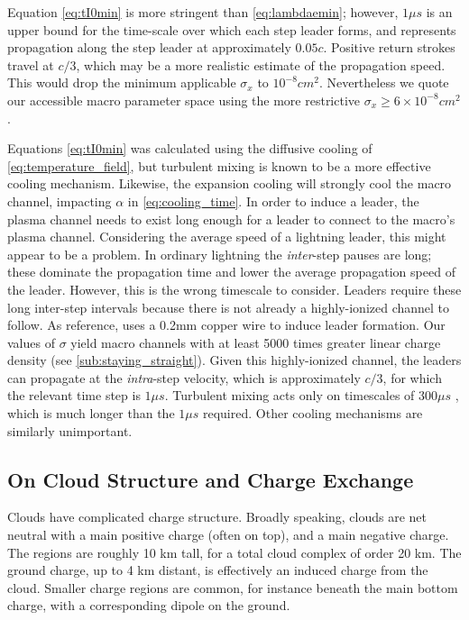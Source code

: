 \documentclass[%
 reprint,
 amsmath,amssymb,
 aps,
 nofootinbib, %
]{revtex4-2}
\begin{document}
        Equation \eqref{eq:tI0min} is more stringent than \eqref{eq:lambdaemin}; however, $1\mu{s}$ is an upper bound for the time-scale over which each step leader forms, and represents propagation along the step leader at approximately $0.05c$. Positive return strokes travel \citep{Idone1987} at $c/3$, which may be a more realistic estimate of the propagation speed. This would drop the minimum applicable $\sigma_x$ to $10^{-8}cm^2$. Nevertheless we quote our accessible macro parameter space using the more restrictive $\sigma_x \geq 6\times 10^{-8}cm^2$.
        
        Equations \eqref{eq:tI0min} was calculated using the diffusive cooling of \eqref{eq:temperature_field}, but turbulent mixing is known to be a more effective cooling mechanism. Likewise, the expansion cooling will strongly cool the macro channel, impacting $\alpha$ in \eqref{eq:cooling_time}. In order to induce a leader, the plasma channel needs to exist long enough for a leader to connect to the macro's plasma channel. Considering the average speed of a lightning leader, this might appear to be a problem. In ordinary lightning the \textit{inter}-step pauses are long; these dominate the propagation time and lower the average propagation speed of the leader. However, this is the wrong timescale to consider. Leaders require these long inter-step intervals because there is not already a highly-ionized channel to follow. As reference, \citeauthor{Betts2003} \citep{Betts2003} uses a 0.2mm copper wire to induce leader formation. Our values of $\sigma$ yield macro channels with at least 5000 times greater linear charge density (see \ref{sub:staying_straight}). Given this highly-ionized channel, the leaders can propagate at the \textit{intra}-step velocity, which is approximately $c/3$, for which the relevant time step is $1 \mu s$.
        Turbulent mixing acts only on timescales of $300\mu{s}$ \citep{Picone1983}, which is much longer than the $1\mu{s}$ required. Other cooling mechanisms are similarly unimportant.


    \subsection{On Cloud Structure and Charge Exchange}

        Clouds have complicated charge structure. Broadly speaking, clouds are net neutral with a main positive charge (often on top), and a main negative charge. The regions are roughly 10 km tall, for a total cloud complex of order 20 km. The ground charge, up to 4 km distant, is effectively an induced charge from the cloud. Smaller charge regions are common, for instance beneath the main bottom charge, with a corresponding dipole on the ground.
        
\end{document}
